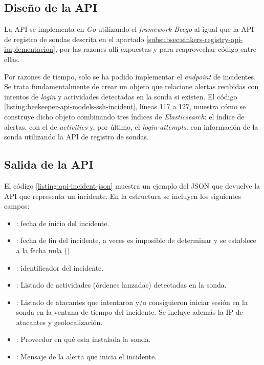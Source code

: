 \subsection{Diseño de la API}

La API se implementa en \emph{Go} utilizando el \emph{framework Beego} al igual que la API de registro de sondas descrita en el apartado \ref{subsubsec:sinkers-registry-api-implementacion}, 
por las razones allí expuestas y para reaprovechar código entre ellas.

Por razones de tiempo, solo se ha podido implementar el \emph{endpoint} de incidentes. Se trata fundamentalmente de crear un objeto
que relacione alertas recibidas con intentos de \emph{login} y actividades detectadas en la sonda si existen. El código \ref{listing:beekeeper-api-models-ssh-incident}, 
líneas 117 a 127, muestra cómo se construye dicho objeto combinando tres índices de \emph{Elasticsearch}: el índice de alertas, con el de \emph{activities} y, por último, el \emph{login-attempts}.
con información de la sonda utilizando la API de registro de sondas.

\subsection{Salida de la API}

El código \ref{listing:api-incident-json} muestra un ejemplo del JSON que devuelve la API que representa un incidente. En la estructura se 
incluyen los siguientes campos:

\begin{itemize}
    \item {}: fecha de inicio del incidente.
    \item {}: fecha de fin del incidente, a veces es imposible de determinar y se establece a la fecha nula ().
    \item {}: identificador del incidente.
    \item {}: Listado de actividades (órdenes lanzadas) detectadas en la sonda.
    \item {}: Listado de atacantes que intentaron y/o consiguieron iniciar sesión en la sonda en la ventana de tiempo del incidente. Se incluye además la IP de atacantes y geolocalización.
    \item {}: Proveedor en qué esta instalada la sonda.
    \item {}: Mensaje de la alerta que inicia el incidente.
\end{itemize}

